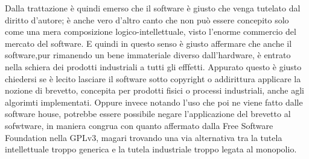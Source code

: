 Dalla trattazione è quindi emerso che il software è giusto che venga tutelato dal diritto d'autore; è anche vero d'altro canto che non può essere concepito solo come una mera composizione logico-intellettuale, visto l'enorme commercio del mercato del software. E quindi in questo senso è giusto affermare che anche il software,pur rimanendo un bene immateriale diverso dall'hardware, è entrato nella schiera dei prodotti industriali a tutti gli efffetti. Appurato questo è giusto chiedersi se è lecito lasciare il software sotto copyright o addirittura applicare la nozione di brevetto, concepita per prodotti fisici o processi industriali, anche agli algorimti implementati. Oppure invece notando l'uso che poi ne viene fatto dalle software house, potrebbe essere possibile negare l'applicazione del brevetto al sofwtware, in maniera congrua con quanto affermato dalla Free Software Foundation nella GPLv3, magari trovando una via alternativa tra la tutela intellettuale troppo generica e la tutela industriale troppo legata al monopolio.
